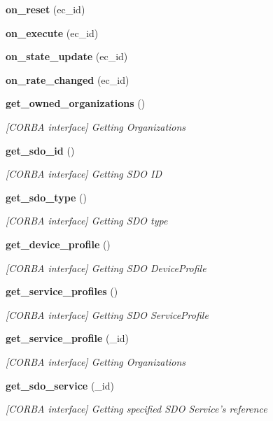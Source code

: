 \begin{CompactItemize}
\item 
{\bf on\_\-reset} (ec\_\-id)
\item 
{\bf on\_\-execute} (ec\_\-id)
\item 
{\bf on\_\-state\_\-update} (ec\_\-id)
\item 
{\bf on\_\-rate\_\-changed} (ec\_\-id)
\item 
{\bf get\_\-owned\_\-organizations} ()
\begin{CompactList}\small\item\em [CORBA interface] Getting Organizations \item\end{CompactList}\item 
{\bf get\_\-sdo\_\-id} ()
\begin{CompactList}\small\item\em [CORBA interface] Getting SDO ID \item\end{CompactList}\item 
{\bf get\_\-sdo\_\-type} ()
\begin{CompactList}\small\item\em [CORBA interface] Getting SDO type \item\end{CompactList}\item 
{\bf get\_\-device\_\-profile} ()
\begin{CompactList}\small\item\em [CORBA interface] Getting SDO Device\-Profile \item\end{CompactList}\item 
{\bf get\_\-service\_\-profiles} ()
\begin{CompactList}\small\item\em [CORBA interface] Getting SDO Service\-Profile \item\end{CompactList}\item 
{\bf get\_\-service\_\-profile} (\_\-id)
\begin{CompactList}\small\item\em [CORBA interface] Getting Organizations \item\end{CompactList}\item 
{\bf get\_\-sdo\_\-service} (\_\-id)
\begin{CompactList}\small\item\em [CORBA interface] Getting specified SDO Service's reference \item\end{CompactList}\item 

\end{CompactItemize}
